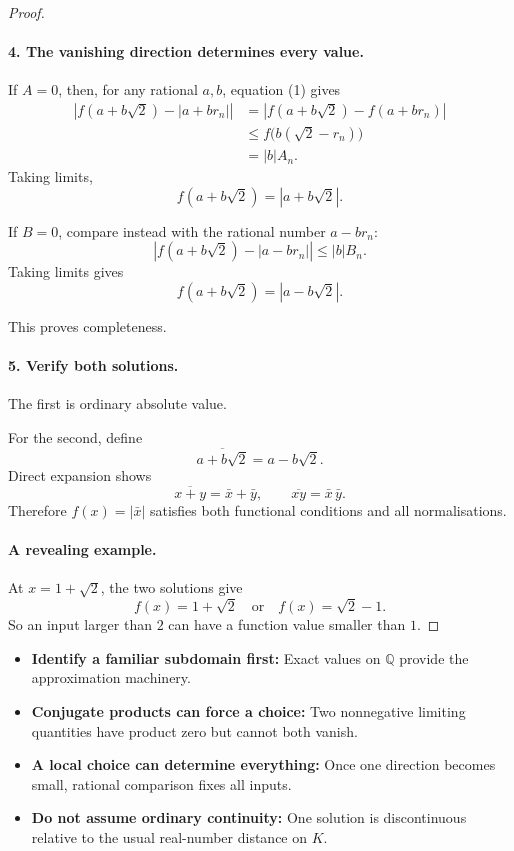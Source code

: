 \begin{dlsummary}[title={\bfseries Solution 64. The Invisible Conjugate},breakable]
\begin{proof}
\paragraph{4. The vanishing direction determines every value.}

If \(A=0\), then, for any rational \(a,b\), equation (1) gives
\[
\begin{aligned}
\left|f(a+b\sqrt2)-|a+br_n|\right|
&=\left|f(a+b\sqrt2)-f(a+br_n)\right|\\
&\le f\bigl(b(\sqrt2-r_n)\bigr)\\
&=|b|A_n.
\end{aligned}
\]
Taking limits,
\[
f(a+b\sqrt2)=|a+b\sqrt2|.
\]

If \(B=0\), compare instead with the rational number \(a-br_n\):
\[
\left|f(a+b\sqrt2)-|a-br_n|\right|
\le |b|B_n.
\]
Taking limits gives
\[
f(a+b\sqrt2)=|a-b\sqrt2|.
\]

This proves completeness.

\paragraph{5. Verify both solutions.}

The first is ordinary absolute value.

For the second, define
\[
\overline{a+b\sqrt2}=a-b\sqrt2.
\]
Direct expansion shows
\[
\overline{x+y}=\bar x+\bar y,
\qquad
\overline{xy}=\bar x\,\bar y.
\]
Therefore \(f(x)=|\bar x|\) satisfies both functional conditions and all normalisations.

\paragraph{A revealing example.}

At \(x=1+\sqrt2\), the two solutions give
\[
f(x)=1+\sqrt2
\quad\text{or}\quad
f(x)=\sqrt2-1.
\]
So an input larger than \(2\) can have a function value smaller than \(1\).
\end{proof}
\end{dlsummary}

\begin{takeaways}
\begin{itemize}
\item \textbf{Identify a familiar subdomain first:} Exact values on \(\mathbb Q\) provide the approximation machinery.
\item \textbf{Conjugate products can force a choice:} Two nonnegative limiting quantities have product zero but cannot both vanish.
\item \textbf{A local choice can determine everything:} Once one direction becomes small, rational comparison fixes all inputs.
\item \textbf{Do not assume ordinary continuity:} One solution is discontinuous relative to the usual real-number distance on \(K\).
\end{itemize}
\end{takeaways}

